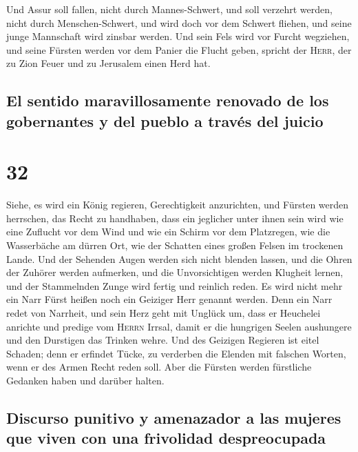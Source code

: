  Und Assur soll fallen, nicht durch Mannes-Schwert, und
soll verzehrt werden, nicht durch Menschen-Schwert, und wird doch vor
dem Schwert fliehen, und seine junge Mannschaft wird zinsbar werden.
 Und sein Fels wird vor Furcht wegziehen, und seine
Fürsten werden vor dem Panier die Flucht geben, spricht der
\textsc{Herr}, der zu Zion Feuer und zu Jerusalem einen Herd hat.

\hypertarget{el-sentido-maravillosamente-renovado-de-los-gobernantes-y-del-pueblo-a-travuxe9s-del-juicio}{%
\subsection{El sentido maravillosamente renovado de los gobernantes y
del pueblo a través del
juicio}\label{el-sentido-maravillosamente-renovado-de-los-gobernantes-y-del-pueblo-a-travuxe9s-del-juicio}}

\hypertarget{section-31}{%
\section{32}\label{section-31}}

 Siehe, es wird ein König regieren, Gerechtigkeit
anzurichten, und Fürsten werden herrschen, das Recht zu handhaben,
 dass ein jeglicher unter ihnen sein wird wie eine
Zuflucht vor dem Wind und wie ein Schirm vor dem Platzregen, wie die
Wasserbäche am dürren Ort, wie der Schatten eines großen Felsen im
trockenen Lande.  Und der Sehenden Augen werden sich nicht
blenden lassen, und die Ohren der Zuhörer werden aufmerken,
 und die Unvorsichtigen werden Klugheit lernen, und der
Stammelnden Zunge wird fertig und reinlich reden.  Es wird
nicht mehr ein Narr Fürst heißen noch ein Geiziger Herr genannt werden.
 Denn ein Narr redet von Narrheit, und sein Herz geht mit
Unglück um, dass er Heuchelei anrichte und predige vom \textsc{Herrn}
Irrsal, damit er die hungrigen Seelen aushungere und den Durstigen das
Trinken wehre.  Und des Geizigen Regieren ist eitel
Schaden; denn er erfindet Tücke, zu verderben die Elenden mit falschen
Worten, wenn er des Armen Recht reden soll.  Aber die
Fürsten werden fürstliche Gedanken haben und darüber halten.

\hypertarget{discurso-punitivo-y-amenazador-a-las-mujeres-que-viven-con-una-frivolidad-despreocupada}{%
\subsection{Discurso punitivo y amenazador a las mujeres que viven con
una frivolidad
despreocupada}\label{discurso-punitivo-y-amenazador-a-las-mujeres-que-viven-con-una-frivolidad-despreocupada}}

